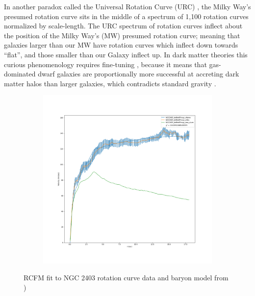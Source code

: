\documentclass[reprint,%
 amsmath,amssymb,
 aps,
]{revtex4-1}
\begin{document}
 
In another  paradox called the Universal Rotation Curve (URC)  \cite{salucci,Persic,1978Rubin,10.1111/j.1365-2966.2007.11696.x},  the Milky Way's presumed rotation curve sits in the middle of 
a spectrum of   1,100  rotation curves normalized by scale-length. 
The URC spectrum of   rotation curves   inflect about the position of the  Milky Way's (MW) presumed rotation curve;  meaning  that galaxies larger than our MW have rotation curves which   inflect down towards ``flat'', and those smaller than our Galaxy  inflect up. 
In dark matter theories this   curious phenomenology requires fine-tuning  \cite{MCGAUGH2021220},    because it means 
that  gas-dominated dwarf galaxies    are proportionally more successful at accreting dark matter halos than larger galaxies, which contradicts   standard  gravity \cite{10.1093/mnras/stt2403}.  %
 

 
   \begin{figure}[h!] 
    \begin{subfigure}[c]{0.95\linewidth}
    \centering
    \includegraphics[width=0.95\linewidth]{figures/NGC2403_deBlokThings_XueSofue}
  \end{subfigure}%
  \caption{ RCFM fit to  NGC 2403  rotation curve data and   baryon model from  \citet{Blok1})}  \label{fig:NGC2403RCFM} 
\end{figure}
\end{document}
